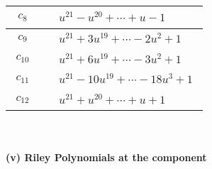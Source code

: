 \documentclass[1p]{elsarticle_modified}
\theoremstyle{definition}
\begin{document}
\begin{tabular}{m{50pt}|m{274pt}}
\hline $$\begin{aligned}c_{8}\end{aligned}$$&$\begin{aligned}
&u^{21}- u^{20}+\cdots+u-1
\end{aligned}$\\
\hline $$\begin{aligned}c_{9}\end{aligned}$$&$\begin{aligned}
&u^{21}+3 u^{19}+\cdots-2 u^2+1
\end{aligned}$\\
\hline $$\begin{aligned}c_{10}\end{aligned}$$&$\begin{aligned}
&u^{21}+6 u^{19}+\cdots-3 u^2+1
\end{aligned}$\\
\hline $$\begin{aligned}c_{11}\end{aligned}$$&$\begin{aligned}
&u^{21}-10 u^{19}+\cdots-18 u^3+1
\end{aligned}$\\
\hline $$\begin{aligned}c_{12}\end{aligned}$$&$\begin{aligned}
&u^{21}+u^{20}+\cdots+u+1
\end{aligned}$\\
\hline
\end{tabular}\\~\\
\newpage\renewcommand{\arraystretch}{1}
\flushleft \textbf{(v) Riley Polynomials at the component}\newline \\
\end{document}
